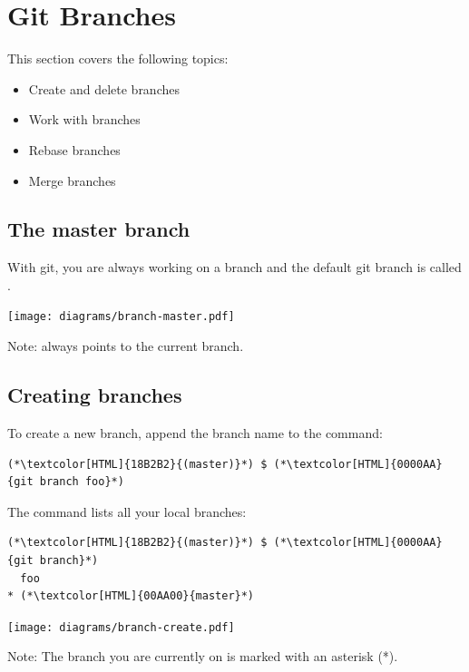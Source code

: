 \section{Git Branches}
\begin{frame}[fragile]
  \slidetitle

  This section covers the following topics:
  \begin{itemize}
    \item Create and delete branches
    \item Work with branches
    \item Rebase branches
    \item Merge branches
  \end{itemize}
\end{frame}

\subsection{The master branch}
\begin{frame}[fragile]
  \subslidetitle

  With git, you are always working on a branch and the default git branch is called .
  \newline \vspace{1em}
  \centerline{\texttt{[image: diagrams/branch-master.pdf]}}

  \vspace{1.2em}
  Note:  always points to the current branch.

\end{frame}

\subsection{Creating branches}
\begin{frame}[fragile]
  \subslidetitle

  To create a new  branch, append the branch name to the  command:
  \begin{lstlisting}
(*\textcolor[HTML]{18B2B2}{(master)}*) $ (*\textcolor[HTML]{0000AA}{git branch foo}*)
\end{lstlisting}

  The  command lists all your local branches:
  \begin{lstlisting}
(*\textcolor[HTML]{18B2B2}{(master)}*) $ (*\textcolor[HTML]{0000AA}{git branch}*)
  foo
* (*\textcolor[HTML]{00AA00}{master}*)
\end{lstlisting}
  \vspace{1em}
  \centerline{\texttt{[image: diagrams/branch-create.pdf]}}
  \vspace{1em}
  Note: The branch you are currently on is marked with an asterisk (*).
\end{frame}

